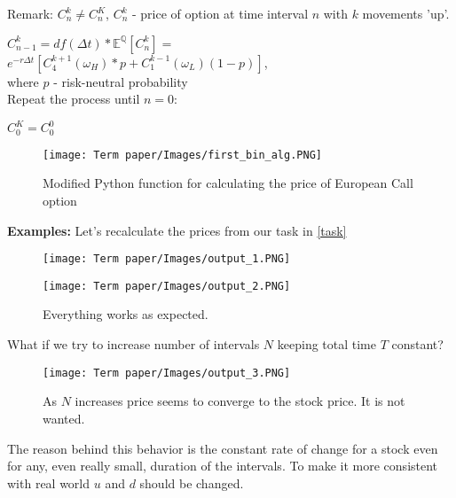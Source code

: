 \documentclass[11pt]{article}
\begin{document}
\noindent\begin{minipage}{0.44\textwidth}
Remark: $C_n^k \ne C_n^K$, $C_n^k$ - price of option at time interval $n$ with $k$ movements 'up'. \vspace{1cm}

$C_{n-1}^k = df(\Delta{t}) * \mathbb{E^Q}{[C_n^k]} =$ \\
$e^{-r\Delta{t}}[{C_4^{k+1}}(\omega_H)*p + {C_1^{k-1}}(\omega_L)(1-p)]$,\\
where $p$ - risk-neutral probability
\vspace{1cm}
\\ Repeat the process until $n = 0$: \\ \centerline{$C_0^K = C_0^0$}
\end{minipage}%
\hfill%
\begin{minipage}{0.7\textwidth}\raggedleft
\begin{figure}[H]
  \centering
  \texttt{[image: Term paper/Images/first\_bin\_alg.PNG]}
  \caption{Modified Python function for calculating the price of European Call option \protect\cite{JT_3}}
  \label{fig:fbinalg}
\end{figure}
\end{minipage}

\newpage
\textbf{Examples:}
Let's recalculate the prices from our task in \ref{task}
\begin{figure}[H]
  \centering
  \texttt{[image: Term paper/Images/output\_1.PNG]}
  \label{fig:out1}
\end{figure}

\begin{figure}[H]
  \centering
  \texttt{[image: Term paper/Images/output\_2.PNG]}
  \caption{Everything works as expected.}
  \label{fig:out2}
\end{figure}

\vspace{0.5cm}
\par What if we try to increase number of intervals $N$ keeping total time $T$ constant?
\begin{figure}[H]
  \centering
  \texttt{[image: Term paper/Images/output\_3.PNG]}
  \caption{As $N$ increases price seems to converge to the stock price. It is not wanted.}
  \label{fig:out3}
\end{figure}
The reason behind this behavior is the constant rate of change for a stock even for any, even really small, duration of the intervals. To make it more consistent with real world $u$ and $d$ should be changed.\\
\end{document}
